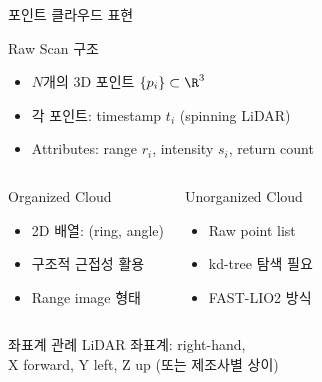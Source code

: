 \begin{frame}{포인트 클라우드 표현}
  \begin{block}{Raw Scan 구조}
    \begin{itemize}
      \item $N$개의 3D 포인트 $\{p_i\} \subset \R^3$
      \item 각 포인트: timestamp $t_i$ (spinning LiDAR)
      \item Attributes: range $r_i$, intensity $s_i$, return count
    \end{itemize}
  \end{block}
  \pause
  \begin{columns}
    \begin{block}{Organized Cloud}
      \begin{itemize}
        \item 2D 배열: (ring, angle)
        \item 구조적 근접성 활용
        \item Range image 형태
      \end{itemize}
    \end{block}
    \begin{block}{Unorganized Cloud}
      \begin{itemize}
        \item Raw point list
        \item kd-tree 탐색 필요
        \item FAST-LIO2 방식
      \end{itemize}
    \end{block}
  \end{columns}
  \pause
  \begin{exampleblock}{좌표계 관례}
    LiDAR 좌표계: right-hand,\\
    X forward, Y left, Z up (또는 제조사별 상이)
  \end{exampleblock}
\end{frame}

